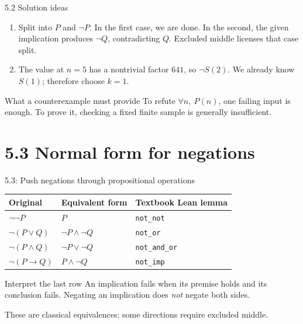 \begin{frame}{5.2 Solution ideas}
\begin{enumerate}
\item Split into $P$ and $\neg P$. In the first case, we are done. In the second, the given implication produces $\neg Q$, contradicting $Q$. Excluded middle licenses that case split.
\item The value at $n=5$ has a nontrivial factor $641$, so $\neg S(2)$. We already know $S(1)$; therefore choose $k=1$.
\end{enumerate}
\begin{block}{What a counterexample must provide}
To refute $\forall n,\ P(n)$, one failing input is enough. To prove it, checking a fixed finite sample is generally insufficient.
\end{block}
\end{frame}

\section{5.3 Normal form for negations}
\begin{frame}{5.3: Push negations through propositional operations}
\begin{center}
\begin{tabular}{lll}
\toprule
Original & Equivalent form & Textbook Lean lemma\\\midrule
$\neg\neg P$ & $P$ & \texttt{not\_not}\\[2mm]
$\neg(P\lor Q)$ & $\neg P\land\neg Q$ & \texttt{not\_or}\\[2mm]
$\neg(P\land Q)$ & $\neg P\lor\neg Q$ & \texttt{not\_and\_or}\\[2mm]
$\neg(P\to Q)$ & $P\land\neg Q$ & \texttt{not\_imp}\\\bottomrule
\end{tabular}
\end{center}
\begin{block}{Interpret the last row}
An implication fails when its premise holds and its conclusion fails. Negating an implication does \emph{not} negate both sides.
\end{block}
These are classical equivalences; some directions require excluded middle.
\end{frame}

